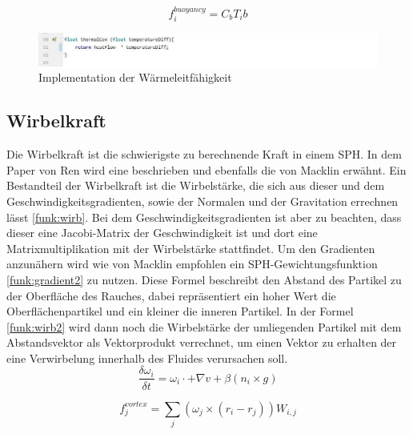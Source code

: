 \documentclass[intern,palatino]{cgBA}
\begin{document}
\begin{equation}\label{funk:temp3}
f^{buoyancy}_i  = C_b T_i b
\end{equation}


\begin{figure}[H]
	\centering
	\includegraphics[width=1.35\columnwidth]{Bilder/thermal.jpg}
	\caption{Implementation der Wärmeleitfähigkeit}
	\label{img:temp}
\end{figure}


\subsection{Wirbelkraft}\label{wirbel}

Die Wirbelkraft ist die schwierigste zu berechnende Kraft in einem SPH. In dem Paper von Ren \cite{ren2016fast} wird eine beschrieben und ebenfalls die von Macklin \cite{macklin2014unified} erwähnt.
\newline
Ein Bestandteil der Wirbelkraft ist die Wirbelstärke, die sich aus dieser und dem Geschwindigkeitsgradienten, sowie der Normalen und der Gravitation errechnen lässt \ref{funk:wirb}. Bei dem Geschwindigkeitsgradienten ist aber zu beachten, dass dieser eine Jacobi-Matrix der Geschwindigkeit ist und dort eine Matrixmultiplikation mit der Wirbelstärke stattfindet. Um den Gradienten anzunähern wird wie von Macklin \cite{macklin2014unified} empfohlen ein SPH-Gewichtungsfunktion \ref{funk:gradient2} zu nutzen. Diese Formel beschreibt den Abstand des Partikel zu der Oberfläche des Rauches, dabei repräsentiert ein hoher Wert die Oberflächenpartikel und ein kleiner die inneren Partikel.
In der Formel \ref{funk:wirb2} wird dann noch die Wirbelstärke der umliegenden Partikel mit dem Abstandsvektor als Vektorprodukt verrechnet, um einen Vektor zu erhalten der eine Verwirbelung innerhalb des Fluides verursachen soll.  
\begin{equation}\label{funk:wirb}
\frac{\delta \omega_i}{\delta t}  = \omega_i \cdot + \nabla v + \beta(n_i \times g)
\end{equation}

\begin{equation}\label{funk:wirb2}
f^{vortex}_j  = \sum_j (\omega_j \times (r_i -r_j)) W_{i,j}
\end{equation}
\end{document}
